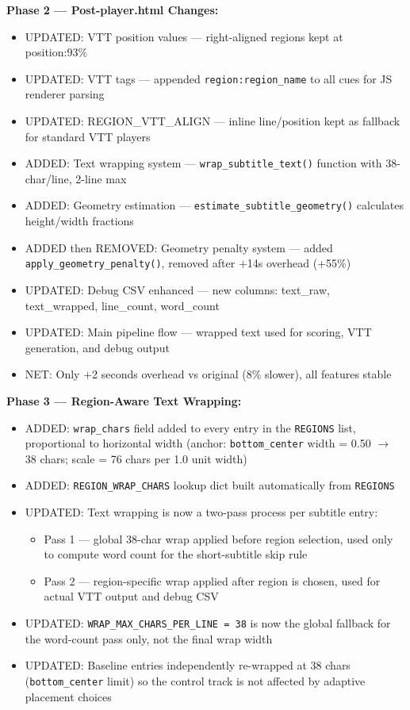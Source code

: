 \documentclass[11pt]{article}
\begin{document}
\textbf{Phase 2 --- Post-player.html Changes:}
\begin{itemize}[leftmargin=1.2em]
    \item UPDATED: VTT position values --- right-aligned regions kept at position:93\%
    \item UPDATED: VTT tags --- appended \texttt{region:region\_name} to all cues for JS renderer parsing
    \item UPDATED: REGION\_VTT\_ALIGN --- inline line/position kept as fallback for standard VTT players
    \item ADDED: Text wrapping system --- \texttt{wrap\_subtitle\_text()} function with 38-char/line, 2-line max
    \item ADDED: Geometry estimation --- \texttt{estimate\_subtitle\_geometry()} calculates height/width fractions
    \item ADDED then REMOVED: Geometry penalty system --- added \texttt{apply\_geometry\_penalty()}, removed after $+$14s overhead (+55\%)
    \item UPDATED: Debug CSV enhanced --- new columns: text\_raw, text\_wrapped, line\_count, word\_count
    \item UPDATED: Main pipeline flow --- wrapped text used for scoring, VTT generation, and debug output
    \item NET: Only $+$2 seconds overhead vs original (8\% slower), all features stable
\end{itemize}

\textbf{Phase 3 --- Region-Aware Text Wrapping:}
\begin{itemize}[leftmargin=1.2em]
    \item ADDED: \texttt{wrap\_chars} field added to every entry in the \texttt{REGIONS} list, proportional to horizontal width (anchor: \texttt{bottom\_center} width = 0.50 $\rightarrow$ 38 chars; scale = 76 chars per 1.0 unit width)
    \item ADDED: \texttt{REGION\_WRAP\_CHARS} lookup dict built automatically from \texttt{REGIONS}
    \item UPDATED: Text wrapping is now a two-pass process per subtitle entry:
    \begin{itemize}
        \item Pass 1 --- global 38-char wrap applied before region selection, used only to compute word count for the short-subtitle skip rule
        \item Pass 2 --- region-specific wrap applied after region is chosen, used for actual VTT output and debug CSV
    \end{itemize}
    \item UPDATED: \texttt{WRAP\_MAX\_CHARS\_PER\_LINE = 38} is now the global fallback for the word-count pass only, not the final wrap width
    \item UPDATED: Baseline entries independently re-wrapped at 38 chars (\texttt{bottom\_center} limit) so the control track is not affected by adaptive placement choices
\end{itemize}
\end{document}

